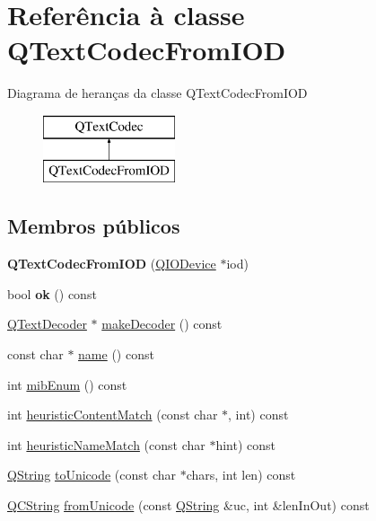 \hypertarget{class_q_text_codec_from_i_o_d}{\section{Referência à classe Q\-Text\-Codec\-From\-I\-O\-D}
\label{class_q_text_codec_from_i_o_d}
}
Diagrama de heranças da classe Q\-Text\-Codec\-From\-I\-O\-D\begin{figure}[H]
\begin{center}
\leavevmode
\includegraphics[height=2.000000cm]{class_q_text_codec_from_i_o_d}
\end{center}
\end{figure}
\subsection*{Membros públicos}
\begin{DoxyCompactItemize}
\item 
\hypertarget{class_q_text_codec_from_i_o_d_a492e222a966ce6fb58eb9767758ecded}{{\bfseries Q\-Text\-Codec\-From\-I\-O\-D} (\hyperlink{class_q_i_o_device}{Q\-I\-O\-Device} $\ast$iod)}\label{class_q_text_codec_from_i_o_d_a492e222a966ce6fb58eb9767758ecded}

\item 
\hypertarget{class_q_text_codec_from_i_o_d_aab5dae3a821c07840093b86003f76be1}{bool {\bfseries ok} () const }\label{class_q_text_codec_from_i_o_d_aab5dae3a821c07840093b86003f76be1}

\item 
\hyperlink{class_q_text_decoder}{Q\-Text\-Decoder} $\ast$ \hyperlink{class_q_text_codec_from_i_o_d_a44f8e6491b9114c4278d8dfb197e951d}{make\-Decoder} () const 
\item 
const char $\ast$ \hyperlink{class_q_text_codec_from_i_o_d_a862958aa3c2b9bf36903f1f0f2e81c54}{name} () const 
\item 
int \hyperlink{class_q_text_codec_from_i_o_d_a5272a4ca2c3d9cdba1c3f2fac3e4d6bd}{mib\-Enum} () const 
\item 
int \hyperlink{class_q_text_codec_from_i_o_d_adc95e908caaf586f4f49a12b0c8ba36b}{heuristic\-Content\-Match} (const char $\ast$, int) const 
\item 
int \hyperlink{class_q_text_codec_from_i_o_d_a7fb3e310dd10564c6a7e2b707a336bbf}{heuristic\-Name\-Match} (const char $\ast$hint) const 
\item 
\hyperlink{class_q_string}{Q\-String} \hyperlink{class_q_text_codec_from_i_o_d_a007974789d47a38acb95816cd5486c8c}{to\-Unicode} (const char $\ast$chars, int len) const 
\item 
\hyperlink{class_q_c_string}{Q\-C\-String} \hyperlink{class_q_text_codec_from_i_o_d_a2c6f9097505dec2780031e680be1c835}{from\-Unicode} (const \hyperlink{class_q_string}{Q\-String} \&uc, int \&len\-In\-Out) const 
\end{DoxyCompactItemize}
